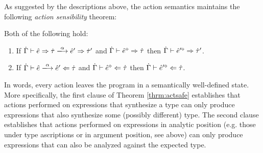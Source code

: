 As suggested by the descriptions above, the action semantics maintains the following \emph{action sensibility} theorem:
\begin{theorem} Both of the following hold:
\label{thrm:actsafe}
\begin{enumerate}
\item If $\performSyn{\hGamma}{\zexp}{\htau}{\alpha}{\zexp'}{\htau'}$ and
  $\dot{\Gamma} \vdash \hat{e}^{\diamond} \Rightarrow \dot{\tau}$ then
  $\dot{\Gamma} \vdash \hat{e}'^{\diamond} \Rightarrow \dot{\tau}'$.
\item If $\performAna{\hGamma}{\zexp}{\htau}{\alpha}{\zexp'}$ and
  $\dot{\Gamma} \vdash \hat{e}^{\diamond} \Leftarrow \dot{\tau}$ then
  $\dot{\Gamma} \vdash \hat{e}'^{\diamond} \Leftarrow \dot{\tau}$.
\end{enumerate}
\end{theorem}
In words, every action leaves the program in a semantically well-defined state. More specifically, the first clause of Theorem \ref{thrm:actsafe} establishes that actions performed on expressions that synthesize a type can only produce expressions that also synthesize some (possibly different) type. The second clause establishes that actions performed on expressions in analytic position (e.g. those under type ascriptions or in argument position, see above) can only produce expressions that can also be analyzed against the expected type.%

